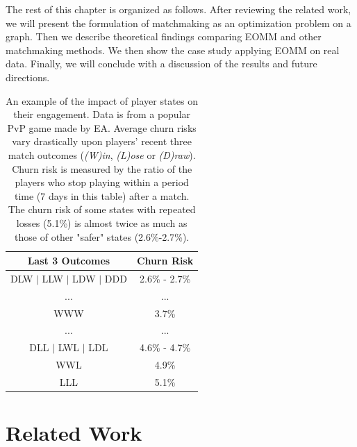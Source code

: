
The rest of this chapter is organized as follows. After reviewing the related work, we will present the formulation of matchmaking as an optimization problem on a graph. Then we describe theoretical findings comparing EOMM and other matchmaking methods. We then show the case study applying EOMM on real data. Finally, we will conclude with a discussion of the results and future directions.


\begin{table}[tb]
\centering
\caption{
An example of the impact of player states on their engagement. Data is from a popular PvP game made by EA. Average churn risks vary drastically upon players' recent three match outcomes (\emph{(W)in}, \emph{(L)ose} or \emph{(D)raw}). Churn risk is measured by the ratio of the players who stop playing within a period time (7 days in this table) after a match. The churn risk of some states with repeated losses (5.1\%) is almost twice as much as those of other "safer" states (2.6\%-2.7\%).
} \label{tab:churnrate}
\vspace{2mm}
\begin{tabular}{|c|c|}
\hline
Last 3 Outcomes & Churn Risk                      \\ \hline
DLW $|$ LLW $|$ LDW $|$ DDD      &  2.6\% - 2.7\%        \\
... & ...  \\
WWW   &  3.7\% \\
... & ... \\
DLL $|$ LWL $|$ LDL  &  4.6\% - 4.7\%  \\
WWL & 4.9\% \\
LLL & 5.1\% \\
\hline
\end{tabular}
\end{table}


\section{Related Work}\label{sec:review}


